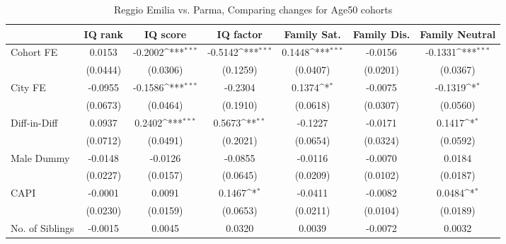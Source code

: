 \begin{table}[htbp]\centering
\def\sym#1{\ifmmode^{#1}\else\(^{#1}\)\fi}
\caption{Reggio Emilia vs. Parma, Comparing changes for Age50 cohorts}
\begin{tabular}{l*{6}{c}}
\toprule
            &\multicolumn{1}{c}{IQ rank}&\multicolumn{1}{c}{IQ score}&\multicolumn{1}{c}{IQ factor}&\multicolumn{1}{c}{Family Sat.}&\multicolumn{1}{c}{Family Dis.}&\multicolumn{1}{c}{Family Neutral}\\
\midrule
Cohort FE   &      0.0153         &     -0.2002\sym{***}&     -0.5142\sym{***}&      0.1448\sym{***}&     -0.0156         &     -0.1331\sym{***}\\
            &    (0.0444)         &    (0.0306)         &    (0.1259)         &    (0.0407)         &    (0.0201)         &    (0.0367)         \\
\addlinespace
City FE     &     -0.0955         &     -0.1586\sym{***}&     -0.2304         &      0.1374\sym{*}  &     -0.0075         &     -0.1319\sym{*}  \\
            &    (0.0673)         &    (0.0464)         &    (0.1910)         &    (0.0618)         &    (0.0307)         &    (0.0560)         \\
\addlinespace
Diff-in-Diff&      0.0937         &      0.2402\sym{***}&      0.5673\sym{**} &     -0.1227         &     -0.0171         &      0.1417\sym{*}  \\
            &    (0.0712)         &    (0.0491)         &    (0.2021)         &    (0.0654)         &    (0.0324)         &    (0.0592)         \\
\addlinespace
Male Dummy  &     -0.0148         &     -0.0126         &     -0.0855         &     -0.0116         &     -0.0070         &      0.0184         \\
            &    (0.0227)         &    (0.0157)         &    (0.0645)         &    (0.0209)         &    (0.0102)         &    (0.0187)         \\
\addlinespace
CAPI        &     -0.0001         &      0.0091         &      0.1467\sym{*}  &     -0.0411         &     -0.0082         &      0.0484\sym{*}  \\
            &    (0.0230)         &    (0.0159)         &    (0.0653)         &    (0.0211)         &    (0.0104)         &    (0.0189)         \\
\addlinespace
No. of Siblings&     -0.0015         &      0.0045         &      0.0320         &      0.0039         &     -0.0072         &      0.0032         \\

\end{tabular}
\end{table}
